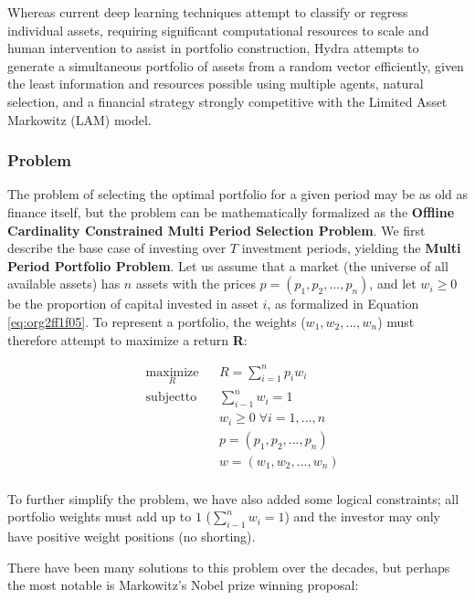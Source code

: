 \documentclass[11pt, a4paper]{awesome-cv}
\begin{document}
\begin{cvletter}
Whereas current deep learning techniques attempt to classify or regress
individual assets, requiring significant computational resources to scale and
human intervention to assist in portfolio construction, Hydra attempts to
generate a simultaneous portfolio of assets from a random vector efficiently,
given the least information and resources possible using multiple agents,
natural selection, and a financial strategy strongly competitive with the
Limited Asset Markowitz (LAM) model.

\subsubsection{Problem}

The problem of selecting the optimal portfolio for a given period may be as old as finance itself, but the problem can be mathematically formalized as the \textbf{Offline Cardinality Constrained Multi Period Selection Problem}. We first describe the base case of investing over \(T\) investment periods, yielding the \textbf{Multi Period Portfolio Problem}. Let us assume that a market (the universe of all available assets) has \(n\) assets with the prices \(p = (p_1 , p_2 , . . . , p_n)\), and let \(w_{i} \geq 0\) be the proportion of capital invested in asset \(i\), as formalized in Equation \ref{eq:org2ff1f05}. To represent a portfolio, the weights (\(w_{1} , w_{2} , . . . , w_{n}\)) must therefore attempt to maximize a return \textbf{R}:

\begin{equation}
\label{eq:org2ff1f05}
\begin{aligned}
& \underset{R}{\mathrm{maximize}}
& & R = \sum_{i=1}^{n} p_i w_i \\
& \mathrm{subject to} & &  \sum_{i-1}^{n} w_i =1 \\
& & & w_i \geq 0 \; \forall i = 1,...,n \\
& & & p = (p_1 , p_2 , . . . , p_n) \\
& & & w = (w_1 , w_2 , . . . , w_n) \\
\end{aligned}
\end{equation}

To further simplify the problem, we have also added some logical constraints;
all portfolio weights must add up to \(1\) (\(\sum_{i-1}^{n}w_{i}=1\)) and the
investor may only have positive weight positions (no shorting).

There have been many solutions to this problem over the decades, but perhaps the most notable is Markowitz's Nobel prize winning proposal:


\end{cvletter}
\end{document}
